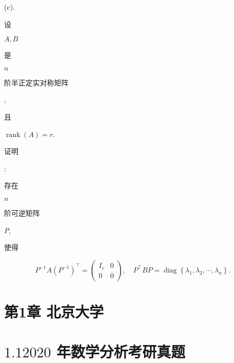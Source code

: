 \documentclass[10pt]{article}
\begin{document}
(c). \begin{CJK}{UTF8}{mj}设\end{CJK} $A, B$ \begin{CJK}{UTF8}{mj}是\end{CJK} $n$ \begin{CJK}{UTF8}{mj}阶半正定实对称矩阵\end{CJK}, \begin{CJK}{UTF8}{mj}且\end{CJK} $\operatorname{rank}(A)=r$. \begin{CJK}{UTF8}{mj}证明\end{CJK}: \begin{CJK}{UTF8}{mj}存在\end{CJK} $n$ \begin{CJK}{UTF8}{mj}阶可逆矩阵\end{CJK} $P$, \begin{CJK}{UTF8}{mj}使得\end{CJK}
$$
P^{-1} A\left(P^{-1}\right)^{\top}=\left(\begin{array}{cc}
I_{r} & 0 \\
0 & 0
\end{array}\right), \quad P^{\top} B P=\operatorname{diag}\left\{\lambda_{1}, \lambda_{2}, \cdots, \lambda_{n}\right\} .
$$

\section{第1章 北京大学}
\section{$1.12020$ 年数学分析考研真题}
\end{document}
